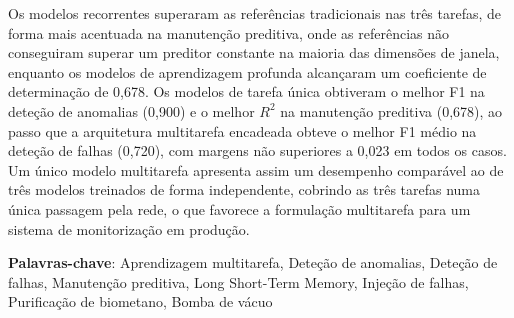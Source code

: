 Os modelos recorrentes superaram as referências tradicionais nas três tarefas, de forma mais acentuada na
manutenção preditiva, onde as referências não conseguiram superar um preditor constante na maioria das
dimensões de janela, enquanto os modelos de aprendizagem profunda alcançaram um coeficiente de determinação
de 0,678. Os modelos de tarefa única obtiveram o melhor F1 na deteção de anomalias (0,900) e o melhor $R^2$
na manutenção preditiva (0,678), ao passo que a arquitetura multitarefa encadeada obteve o melhor F1 médio
na deteção de falhas (0,720), com margens não superiores a 0,023 em todos os casos. Um único modelo
multitarefa apresenta assim um desempenho comparável ao de três modelos treinados de forma independente,
cobrindo as três tarefas numa única passagem pela rede, o que favorece a formulação multitarefa para um
sistema de monitorização em produção.

\vspace*{10mm}\noindent
\textbf{Palavras-chave}: Aprendizagem multitarefa, Deteção de anomalias, Deteção de falhas,
Manutenção preditiva, Long Short-Term Memory, Injeção de falhas, Purificação de biometano, Bomba de vácuo